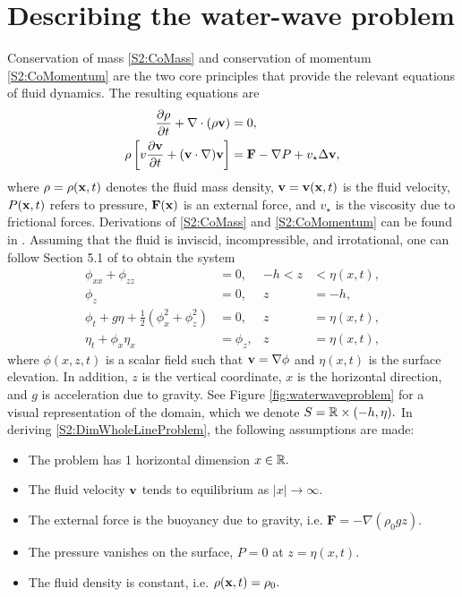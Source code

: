 \section{Describing the water-wave problem}

Conservation of mass \eqref{S2:CoMass} and conservation of momentum \eqref{S2:CoMomentum} are the two core principles that provide the relevant equations of fluid dynamics. The resulting equations are 
\begin{align}
\frac{\partial \rho}{\partial t} + \nabla \cdot (\rho {\bf v}) &= 0, \label{S2:CoMass} \\
\rho\left[ v\frac{\partial {\bf v}}{\partial t} + ({\bf v} \cdot \nabla) {\bf v}\right] &= \textbf{F} - \nabla P + v_{\star} \Delta {\bf v}, \label{S2:CoMomentum}
\end{align}
where $\rho = \rho({\bf x}, t)$ denotes the fluid mass density, ${\bf v} = {\bf v}({\bf x},t)$ is the fluid velocity, $P({\bf x}, t)$ refers to pressure, $\textbf{F}({\bf x})$ is an external force, and $v_{\star}$ is the viscosity due to frictional forces. Derivations of \eqref{S2:CoMass} and \eqref{S2:CoMomentum} can be found in \cite[Chapter 1]{Johnson}. Assuming that the fluid is inviscid, incompressible, and irrotational, one can follow Section 5.1 of \cite{Ablowitz} to obtain the system
\begin{subequations} \label{S2:DimWholeLineProblem}
\begin{align}
\phi_{xx} + \phi_{zz} &= 0, &-h < z &< \eta(x,t), \label{S2:PDE}\\
\phi_{z} &= 0, &z &= -h, \label{S2:BBC}\\
\phi_t + g\eta + \frac{1}{2}(\phi_{x}^2 + \phi_{z}^2) &= 0, &z &= \eta(x,t), \label{S2:DBC}\\
\eta_t + \phi_{x}\eta_{x} &= \phi_{z}, &z &= \eta(x,t), \label{S2:KBC}
\end{align}
\end{subequations}
where $\phi(x,z, t)$ is a scalar field such that ${\bf v} = \nabla \phi$ and $\eta(x,t)$ is the surface elevation. In addition, $z$ is the vertical coordinate, $x$ is the horizontal direction, and $g$ is acceleration due to gravity. See Figure \ref{fig:waterwaveproblem} for a visual representation of the domain, which we denote $S = \mathbb R \times (-h, \eta).$ In deriving \eqref{S2:DimWholeLineProblem}, the following assumptions are made:
\begin{itemize}
\item The problem has 1 horizontal dimension $x \in \mathbb R.$
\item The fluid velocity ${\bf v}$ tends to equilibrium as $|x| \to \infty.$
\item The external force is the buoyancy due to gravity, i.e. $\textbf{F} = - \nabla (\rho_0 g z).$
\item The pressure vanishes on the surface, $P = 0$ at $z = \eta(x,t).$
\item The fluid density is constant, i.e. $\rho({\bf x},t) = \rho_0.$
\end{itemize}
